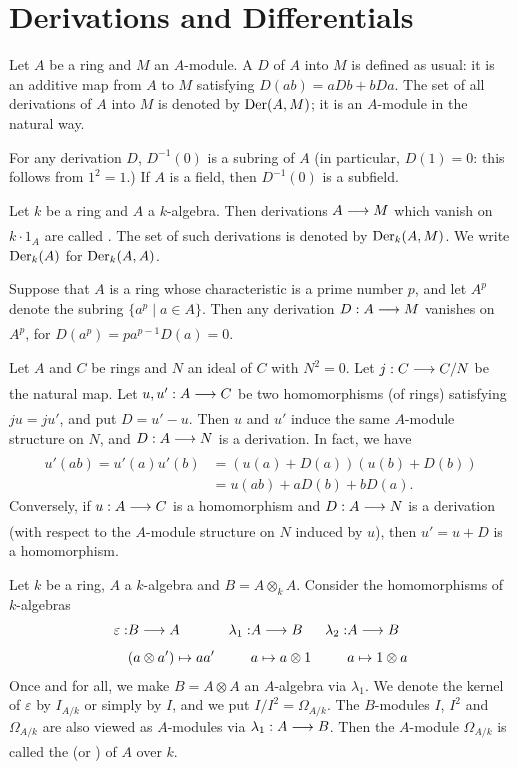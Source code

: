 \documentclass[../main]{subfiles}
\begin{document}
\section{Derivations and Differentials}\label{sec:26}

\newparagraph Let $A$ be a ring and $M$ an $A$-module. A  $D$ of $A$ into $M$ is defined as usual: it is an additive map from $A$ to $M$ satisfying \newline $D(a b)=a D b+b D a$. The set of all derivations of $A$ into $M$ is denoted by $\operatorname{Der}(A, M)$; it is an $A$-module in the natural way.

For any derivation $D$, $D^{-1}(0)$ is a subring of $A$ (in particular, $D(1)=0$: this follows from $1^2=1$.) If $A$ is a field, then $D^{-1}(0)$ is a subfield. 

Let $k$ be a ring and $A$ a $k$-algebra. Then derivations $A \varrightarrow{} M$ which vanish on $k\cdot1_A$ are called . The set of such derivations is denoted by $\operatorname{Der}_k(A, M)$.\label{sym:Derk} We write $\operatorname{Der}_k(A)$ for $\operatorname{Der}_k(A, A)$.

Suppose that $A$ is a ring whose characteristic is a prime number $p$, and let $A^p$ denote the subring $\{a^p \mid a \in A\}$. Then any derivation $D:A \varrightarrow{} M$ vanishes on $A^p$, for $D(a^p)=pa^{p-1} D(a) =0$.

\newparagraph Let $A$ and $C$ be rings and $N$ an ideal of $C$ with $N^2=0$. Let \newline $j: C \varrightarrow{} C / N$ be the natural map. Let $u, u': A \varrightarrow{} C$ be two homomorphisms (of rings) satisfying $ju =j u'$, and put $D= u'-u$. Then $u$ and $u'$ induce the same $A$-module structure on $N$, and $D: A \varrightarrow{} N$ is a derivation. In fact, we have
\[
\begin{aligned}
u'(a b)=u'(a) u'(b) &=(u(a)+D(a))(u(b)+D(b)) \\
&=u(a b)+a D(b)+b D(a).
\end{aligned}
\]
Conversely, if $u: A \varrightarrow{} C$ is a homomorphism and $D: A \varrightarrow{} N$ is a derivation (with respect to the $A$-module structure on $N$ induced by $u$), then $u'=u+D$ is a homomorphism.

\newparagraph Let $k$ be a ring, $A$ a $k$-algebra and $B=A \otimes_k A$. Consider the homomorphisms of $k$-algebras
\[\begin{aligned}
\varepsilon:& B \varrightarrow{} A & \lambda_1:& A \varrightarrow{} B & \lambda_2:&A\varrightarrow{}B\\
&(a\otimes a') \mapsto aa' & &a\mapsto a\otimes 1 & & a \mapsto 1 \otimes a 
\end{aligned}\]
Once and for all, we make $B=A \otimes A$ an $A$-algebra via $\lambda_1$. We denote the kernel of $\varepsilon$ by $I_{A / k}$ or simply by $I$, and we put $I / I^2=\Omega_{A / k}$.\label{sym:differentials} The $B$-modules $I$, $I^2$ and $\Omega_{A/k}$ are also viewed as $A$-modules via $\lambda_1: A \varrightarrow{} B$. Then the $A$-module $\Omega_{A/k}$ is called the  (or ) of $A$ over $k$.
\end{document}
